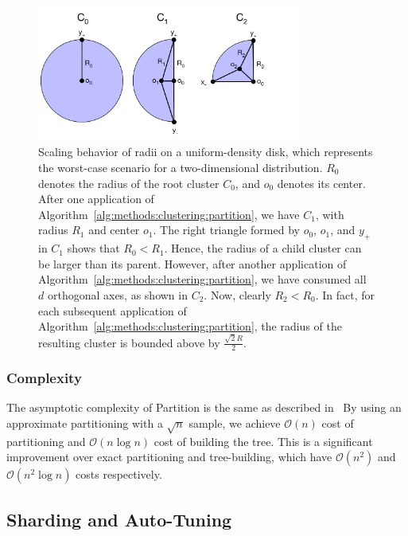\begin{figure}[ht!]
    \centering
    \includegraphics[width=3.4in]{images/geometry/geometry.pdf}
    \caption{
        Scaling behavior of radii on a uniform-density disk, which represents the worst-case scenario for a two-dimensional distribution. 
        $R_0$ denotes the radius of the root cluster $C_0$, and $o_0$ denotes its center. 
        After one application of Algorithm~\ref{alg:methods:clustering:partition}, we have $C_1$, with radius $R_1$ and center $o_1$.
        The right triangle formed by $o_0$, $o_1$, and $y_+$ in $C_1$ shows that $R_0 < R_1$.
        Hence, the radius of a child cluster can be larger than its parent.
        However, after another application of Algorithm~\ref{alg:methods:clustering:partition}, we have consumed all $d$ orthogonal axes, 
        as shown in $C_2$.
        Now, clearly $R_2 < R_0$.
        In fact, for each subsequent application of Algorithm~\ref{alg:methods:clustering:partition}, the radius of the resulting cluster is bounded above by $\frac{\sqrt{2}R}{2}$.
    }
    \label{fig:methods:scaling-behavior}
\end{figure}


\subsubsection {Complexity}
\label{subsubsec:methods:clustering:clustering:complexity}

The asymptotic complexity of Partition is the same as described in~\cite{ishaq2019clustered}
By using an approximate partitioning with a $\sqrt{n}$ sample, we achieve $\mathcal{O}(n)$ cost of partitioning and $\mathcal{O}(n \log n)$ cost of building the tree.
This is a significant improvement over exact partitioning and tree-building, which have $\mathcal{O}(n^2)$ and $\mathcal{O}(n^2 \log n)$ costs respectively.


\subsection {Sharding and Auto-Tuning}
\label{subsec:methods:sharding-and-auto-tuning}

